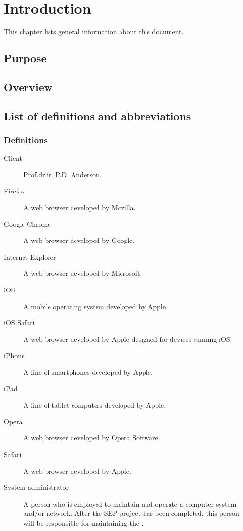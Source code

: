 \chapter{Introduction}
This chapter lists general information about this document.

\section{Purpose}

\section{Overview}

\section{List of definitions and abbreviations}

\subsection{Definitions}

\begin{description}
\item[Client] Prof.dr.ir. P.D. Anderson.
\item[Firefox] A web browser developed by Mozilla.
\item[Google Chrome] A web browser developed by Google.
\item[Internet Explorer] A web browser developed by Microsoft.
\item[iOS] A mobile operating system developed by Apple.
\item[iOS Safari] A web browser developed by Apple designed for devices running iOS.
\item[iPhone] A line of smartphones developed by Apple.
\item[iPad] A line of tablet computers developed by Apple.
\item[Opera] A web browser developed by Opera Software.
\item[Safari] A web browser developed by Apple.
\item[System administrator] A person who is employed to maintain and operate a computer system and/or network. After the SEP project has been completed, this person will be responsible for maintaining the \applicationname{}.
\end{description}

